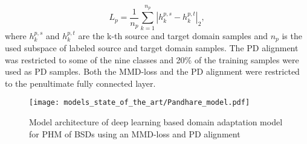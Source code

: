 \begin{equation}
    L_{p} = \frac{1}{n_{p}}\sum_{k=1}^{n_{p}}|h_{k}^{p,s}-h_{k}^{p,t}|_{2}, 
\end{equation}
where $h_{k}^{p,s}$ and $h_{k}^{p,t}$ are the k-th source and target domain samples and $n_{p}$ is the used subspace of labeled source and target domain samples. The PD alignment was restricted to some of the nine classes and 20\% of the training samples were used as PD samples. Both the MMD-loss and the PD alignment were restricted to the penultimate fully connected layer.
\begin{figure}[H]
  \centering
  \texttt{[image: models\_state\_of\_the\_art/Pandhare\_model.pdf]}
  \caption{Model architecture of deep learning based domain adaptation model for PHM of BSDs using an MMD-loss and PD alignment \cite{Pandhare2021}}
  \label{fig:Pandhare_model}
\end{figure}

